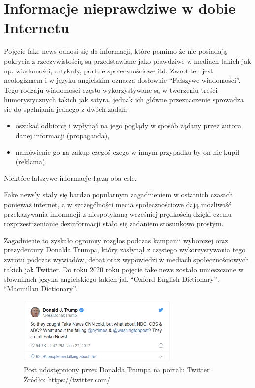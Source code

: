 \chapter{Informacje nieprawdziwe w dobie Internetu}
Pojęcie fake news odnosi się do 
informacji, które pomimo że nie posiadają pokrycia z rzeczywistością są
przedstawiane jako prawdziwe w mediach takich jak np. wiadomości, artykuły, 
portale społecznościowe itd.
Zwrot ten jest neologizmem i w języku angielskim oznacza dosłownie ``Fałszywe wiadomości''.
Tego rodzaju wiadomości często wykorzystywane są w tworzeniu treści humorystycznych 
takich jak satyra, jednak ich główne przeznaczenie sprowadza się do spełniania jednego z dwóch zadań:
\begin{itemize}
    \item oszukać odbiorcę i wpłynąć na jego poglądy w sposób żądany przez autora danej informacji (propaganda),
    \item namówienie go na zakup czegoś czego w innym przypadku by on nie kupił (reklama).
\end{itemize} 
Niektóre fałszywe informacje łączą oba cele.

Fake news'y stały się bardzo popularnym zagadnieniem w ostatnich czasach ponieważ
internet, a w szczególności media społecznościowe dają możliwość przekazywania
informacji z niespotykaną wcześniej prędkością dzięki czemu rozprzestrzenianie 
dezinformacji stało się zadaniem stosunkowo prostym.

Zagadnienie to zyskało ogromny rozgłos podczas kampanii wyborczej oraz
prezydentury Donalda Trumpa, który zasłynął z częstego wykorzystywania 
tego zwrotu podczas wywiadów, debat oraz wypowiedzi w mediach społecznościowych
takich jak Twitter.
Do roku 2020 roku pojęcie fake news zostało umieszczone w słownikach języka angielskiego
takich jak ``Oxford English Dictionary'', ``Macmillan Dictionary''.
\begin{figure}[h!]
    \centering
    \includegraphics[width=0.7\textwidth]{./Img/Trump-Fake-News.png}
    \caption{Post udostępniony przez Donalda Trumpa na portalu Twitter Źródło: https://twitter.com/}
\end{figure}

